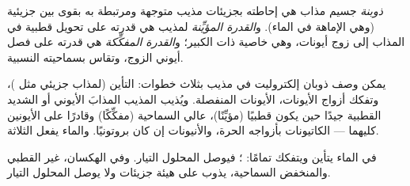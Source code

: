 \begin{definition}\label{def:b1:intermolecular-forces-solvents:dissolution}
\emph{ذوبنة} جسيم مذاب هي
إحاطته بجزيئات مذيب متوجهة ومرتبطة به بقوى
بين جزيئية (وهي الإماهة في الماء). و\emph{القدرة
المؤيِّنة} لمذيب هي قدرته على تحويل
 قطبية في المذاب إلى زوج أيونات، وهي خاصية
 ذات  الكبير؛ و\emph{القدرة
المفكِّكة} هي قدرته على فصل أيوني
الزوج، وتقاس بسماحيته النسبية.
\end{definition}

\begin{proposition}\label{prop:b1:intermolecular-forces-solvents:steps}
يمكن وصف ذوبان إلكتروليت في مذيب بثلاث
خطوات: التأين (لمذاب جزيئي مثل )، وتفكك
أزواج الأيونات،  الأيونات المنفصلة. ويُذيب المذيب
المذابَ الأيوني أو الشديد القطبية جيدًا حين يكون قطبيًا (مؤيِّنًا)، عالي
السماحية (مفكِّكًا) وقادرًا على  الأيونين كليهما --- الكاتيونات
بأزواجه الحرة، والأنيونات  إن كان بروتونيًا.
والماء يفعل الثلاثة.
\end{proposition}

\begin{example}\label{ex:b1:intermolecular-forces-solvents:hcl}
في الماء يتأين  ويتفكك تمامًا:
؛ فيوصل المحلول التيار. وفي
الهكسان، غير القطبي والمنخفض السماحية، يذوب على هيئة جزيئات 
ولا يوصل المحلول التيار.
\end{example}

